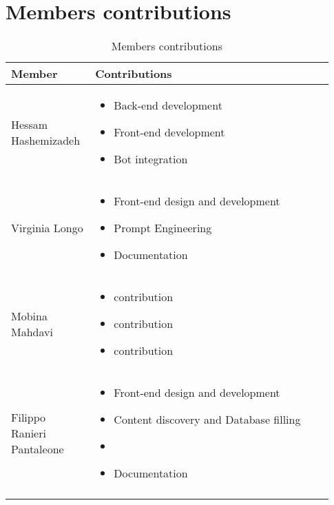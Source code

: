 \section{Members contributions}
\begin{longtable}
    {|m{0.23\linewidth}|m{0.7\linewidth}|}
            \hline
            \textbf{Member} & \textbf{Contributions}\\
            \hline
            \endhead
                Hessam Hashemizadeh & \begin{itemize}
                    \item Back-end development
                    \item Front-end development
                    \item Bot integration
                \end{itemize} \\
            \hline
                 Virginia Longo & \begin{itemize}
                    \item Front-end design and development
                    \item Prompt Engineering
                    \item Documentation
                \end{itemize} \\
            \hline
                 Mobina Mahdavi & \begin{itemize}
                    \item contribution
                    \item contribution
                    \item contribution
                \end{itemize} \\
            \hline
                Filippo Ranieri Pantaleone & \begin{itemize}
                    \item Front-end design and development
                    \item Content discovery and Database filling
                    \item \item Documentation
                \end{itemize} \\
            \hline
            \caption{Members contributions}
            \label{table:mem_contributions}
\end{longtable}
